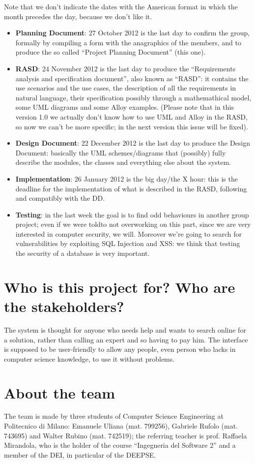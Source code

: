 \documentclass[a4paper,12pt]{article}
\begin{document}
\clearpage

Note that we don’t indicate the dates with the American format
in which the month precedes the day, because we don’t
like it.
\begin{itemize}
\item \textbf{Planning Document}: 27 October 2012 is the last day to confirm the group, formally by compiling a form with the anagraphics of the members, and to produce the so called “Project Planning Document” (this one).
\item \textbf{RASD}: 24 November 2012 is the last day to produce the “Requirements analysis and specification document”, also known as “RASD”: it contains the use scenarios and the use cases, the description of all the requirements in natural language, their specification possibly through a mathemathical model, some UML diagrams and some Alloy examples. (Please note that in this version 1.0 we actually don’t know how to use UML and Alloy in the RASD, so now we can’t be more specific; in the next version this issue will be fixed).
\item \textbf{Design Document}: 22 December 2012 is the last day to produce the Design Document: basically the UML schemes/diagrams that (possibly) fully describe the modules, the classes and everything else about the system.
\item \textbf{Implementation}: 26 January 2012 is the big day/the X hour: this is the deadline for the implementation of what is described in the RASD, following and compatibly with the DD.
\item \textbf{Testing}: in the last week the goal is to find odd behaviours in another group project; even if we were toldto not overworking on this part, since we are very interested in computer security, we will. Moreover we’re going to search for vulnerabilities by exploiting SQL Injection and XSS: we think that testing the security of a database is very important.
\end{itemize}

\section{Who is this project for? Who are the stakeholders?}
The system is thought for anyone who needs help and wants to search online for a solution, rather than calling an expert and so having to pay him. The interface is supposed to be user-friendly to allow any people, even person who lacks in computer science knowledge, to use it without problems.
\section{About the team}
The team is made by three students of Computer Science Engineering at Politecnico di Milano: Emanuele Uliana (mat. 799256), Gabriele Rufolo (mat. 743695) and Walter Rubino (mat. 742519); the referring teacher is prof. Raffaela Mirandola, who is the holder of the course “Ingegneria del Software 2” and a member of the DEI, in particular of the DEEPSE.
\end{document}
